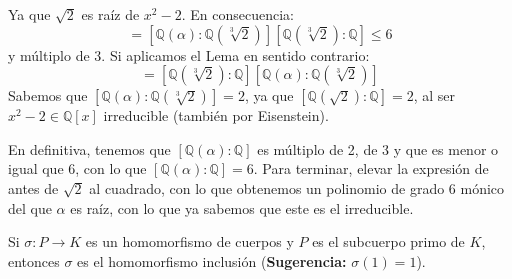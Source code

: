 \begin{ejercicio}
\begin{enumerate}[label=\alph*)]
            Ya que $\sqrt{2}$ es raíz de $x^2-2$. En consecuencia:
            \begin{equation*}
                [\mathbb{Q}(\alpha):\mathbb{Q}] = [\mathbb{Q}(\alpha):\mathbb{Q}(\sqrt[3]{2})][\mathbb{Q}(\sqrt[3]{2}):\mathbb{Q}] \leq 6
            \end{equation*}
            y múltiplo de $3$. Si aplicamos el Lema en sentido contrario:
            \begin{equation*}
                [\mathbb{Q}(\alpha):\mathbb{Q}] = [\mathbb{Q}(\sqrt[3]{2}):\mathbb{Q}][\mathbb{Q}(\alpha):\mathbb{Q}(\sqrt[3]{2})]
            \end{equation*}
            Sabemos que $[\mathbb{Q}(\alpha):\mathbb{Q}(\sqrt[3]{2})]=2$, ya que $[\mathbb{Q}(\sqrt{2}):\mathbb{Q}]=2$, al ser $x^2-2\in \mathbb{Q}[x]$ irreducible (también por Eisenstein).

            En definitiva, tenemos que $[\mathbb{Q}(\alpha):\mathbb{Q}]$ es múltiplo de 2, de 3 y que es menor o igual que 6, con lo que $[\mathbb{Q}(\alpha):\mathbb{Q}] = 6$. Para terminar, elevar la expresión de antes de $\sqrt{2}$ al cuadrado, con lo que obtenemos un polinomio de grado 6 mónico del que $\alpha$ es raíz, con lo que ya sabemos que este es el irreducible.
    \end{enumerate}
\end{ejercicio}

\begin{ejercicio} %
    Si $\sigma:P\to K$ es un homomorfismo de cuerpos y $P$ es el subcuerpo primo de $K$, entonces $\sigma$ es el homomorfismo inclusión (\textbf{Sugerencia:} $\sigma(1)=1$).
\end{ejercicio}

